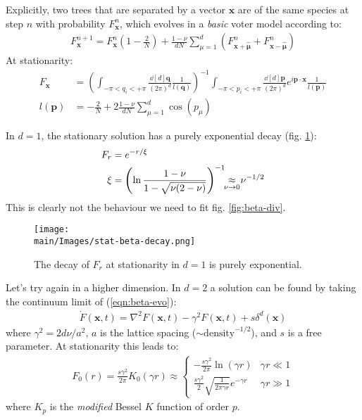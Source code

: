\documentclass[../../main.tex]{subfiles}
\begin{document}
\medskip
Explicitly, two trees that are separated by a vector $\bm{x}$ are of the same species at step $n$ with probability $F_{\bm{x}}^{n}$, which evolves in a \textit{basic} voter model according to:
\begin{align}\label{eqn:beta-evo}
    F_{\bm{x}}^{n+1} = F_{\bm{x}}^n \left(1 - \frac{2}{N} \right) + \frac{1-\nu}{d N} \sum_{\mu=1}^d (F_{\bm{x} + \bm{\hat{\mu}}}^n + F_{\bm{x} - \bm{\hat{\mu}}}^n) 
\end{align}
At stationarity:
\begin{align*}
    F_{\bm{x}} &= \left(\int_{-\pi < q_i < +\pi} \frac{\dd[d]{\bm{q}}}{(2\pi)^d} \frac{1}{l(\bm{q})}  \right)^{-1} \int_{-\pi < p_i < +\pi} \frac{\dd[d]{\bm{p}}}{(2\pi)^d} e^{i \bm{p} \cdot \bm{x}} \frac{1}{l(\bm{p})}\\
    l(\bm{p}) &= -\frac{2}{N} + 2 \frac{1-\nu}{d N} \sum_{\mu=1}^d \cos(p_\mu)  
\end{align*}

In $d = 1$, the stationary solution has a purely exponential decay (fig. \ref{fig:stat-beta-decay}):
\begin{align*}
    F_r &= e^{-r/\xi}\\
    \xi &= \left(\ln \frac{1-\nu}{1 - \sqrt{\nu(2-\nu)}} \right)^{-1} \underset{\mathclap{\nu \to 0}}{\approx} \> \nu^{-1/2}
\end{align*}
This is clearly not the behaviour we need to fit fig. \ref{fig:beta-div}. 

\begin{figure}[H]
    \centering
    \texttt{[image: \\main/Images/stat-beta-decay.png]}
    \caption{The decay of $F_r$ at stationarity in $d=1$ is purely exponential.}
    \label{fig:stat-beta-decay}
\end{figure}

Let's try again in a higher dimension. In $d=2$ a solution can be found by taking the continuum limit of (\ref{eqn:beta-evo}):
\begin{align*}
    \dot{F}(\bm{x},t) = \nabla^2 F(\bm{x},t) - \gamma^2 F(\bm{x},t) + s \delta^d(\bm{x})
\end{align*}
where $\gamma^2 = 2d \nu/a^2$, $a$ is the lattice spacing ($\sim \mathrm{density}^{-1/2}$), and $s$ is a free parameter. At stationarity this leads to:
\begin{align}\label{eqn:f0}
    F_0(r) = \frac{s \gamma^2}{2 \pi} K_0(\gamma r) \approx \begin{cases}
        - \frac{s \gamma^2}{2 \pi} \ln (\gamma r) & \gamma r \ll 1\\
        \frac{s \gamma^2}{2} \sqrt{\frac{1}{2 \pi \gamma r} }   e^{-\gamma r} & \gamma r \gg 1
    \end{cases} 
\end{align}
where $K_p$ is the \textit{modified} Bessel $K$ function of order $p$. 
\end{document}
